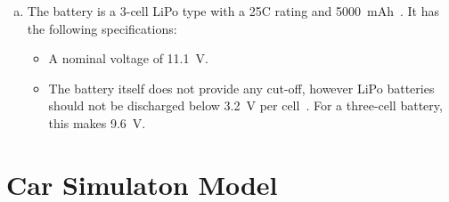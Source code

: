 \documentclass[letta4 paper]{article}
\numberwithin{equation}{section}
\newcommand{\0}{\mathbf{0}}
\begin{document}
\begin{enumerate}[a.) ]
\begin{itemize}
      \end{itemize}
      \item The battery is a 3-cell LiPo type with a 25C rating and \SI{5000}{mAh}~\cite{battery}. It has the following specifications: \begin{itemize}
         \item A nominal voltage of \SI{11.1}{V}.
         \item The battery itself does not provide any cut-off, however LiPo batteries should not be discharged below \SI{3.2}{V} per cell~\cite{battery-guide}. For a three-cell battery, this makes \SI{9.6}{V}.
      \end{itemize}
   \end{enumerate}

	\section{Car Simulaton Model}
\end{document}
